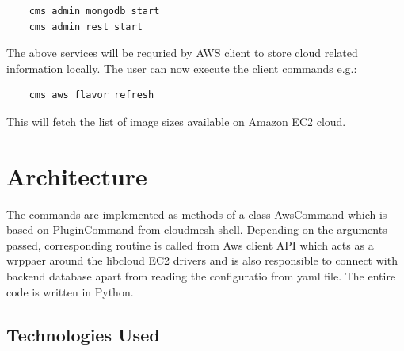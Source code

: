 \documentclass[9pt,twocolumn,twoside]{../../styles/osajnl}
\begin{document}
\begin{verbatim}
    cms admin mongodb start
    cms admin rest start
\end{verbatim}

The above services will be requried by AWS client to store cloud related information locally. The user can now execute the client commands e.g.:

\begin{verbatim}
    cms aws flavor refresh
\end{verbatim}

This will fetch the list of image sizes available on Amazon EC2 cloud.

\section{Architecture}

The commands are implemented as methods of a class AwsCommand which is based on PluginCommand from cloudmesh shell. Depending on the arguments passed, corresponding routine is called from Aws client API which acts as a wrppaer around the libcloud EC2 drivers and is also responsible to connect with backend database apart from reading the configuratio from yaml file. The entire code is written in Python.

\subsection{Technologies Used}
\end{document}
